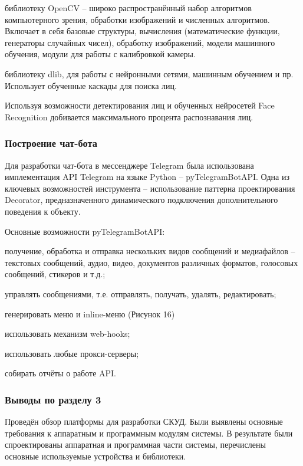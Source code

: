\begin{itemize*}
\item библиотеку OpenCV -- широко распространённый набор алгоритмов компьютерного зрения, обработки изображений и численных алгоритмов. Включает в себя базовые структуры, вычисления (математические функции, генераторы случайных чисел), обработку изображений, модели машинного обучения, модули для работы с калибровкой камеры.
\item библиотеку dlib, для работы с нейронными сетями, машинным обучением и пр. Использует обученные каскады для поиска лиц.
\end{itemize*}

Используя возможности детектирования лиц и обученных нейросетей Face Recognition добивается максимального процента распознавания лиц.

\subsubsection{Построение чат-бота}
Для разработки чат-бота в мессенджере Telegram была использована имплементация API Telegram на языке Python -- pyTelegramBotAPI. Одна из ключевых возможностей инструмента -- использование паттерна проектирования Decorator, предназначенного динамического подключения дополнительного поведения к объекту.

Основные возможности pyTelegramBotAPI:

\begin{itemize*}
\item получение, обработка и отправка нескольких видов сообщений и медиафайлов -- текстовых сообщений, аудио, видео, документов различных форматов, голосовых сообщений, стикеров и т.д.;
\item управлять сообщениями, т.е. отправлять, получать, удалять, редактировать;
\item генерировать меню и inline-меню (Рисунок 16)
\item использовать механизм web-hooks;
\item использовать любые прокси-серверы;
\item собирать отчёты о работе API.
\end{itemize*}


\subsubsection{Выводы по разделу 3}

Проведён обзор платформы для разработки СКУД. Были выявлены основные требования к аппаратным и программным модулям системы. В результате были спроектированы аппаратная и программная части системы, перечислены основные используемые устройства и библиотеки.

